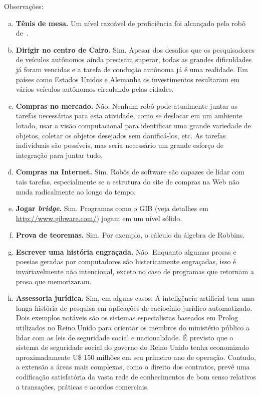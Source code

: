 \begin{solution}
Observações:
\begin{enumerate} [a.]
	\item  \textbf{Tênis de mesa.} Um nível razoável de proficiência foi alcançado pelo robô de~\citet{Andersson1988}.
	
	\item \textbf{Dirigir no centro de Cairo.} Sim. Apesar dos desafios que os pesquisadores de veículos autônomos ainda precisam superar, todas as grandes dificuldades já foram vencidas e a tarefa de condução autônoma já é uma realidade. Em países como Estados Unidos e Alemanha os investimentos resultaram em vários veículos autônomos circulando pelas cidades.
	
	\item \textbf{Compras no mercado.} Não. Nenhum robô pode atualmente juntar as tarefas necessárias para esta atividade, como se deslocar em um ambiente lotado, usar a visão computacional para identificar uma grande variedade de objetos, coletar os objetos desejados sem danificá-los, etc. As tarefas individuais são possíveis, mas seria necessário um grande esforço de integração para juntar tudo.
	
	\item \textbf{Compras na Internet.} Sim. Robôs de software são capazes de lidar com tais tarefas, especialmente se a estrutura do site de compras na Web não muda radicalmente ao longo do tempo.
	
	\item \textbf{Jogar \textit{bridge}.} Sim. Programas como o GIB (veja detalhes em \url{http://www.gibware.com/}) jogam em um nível sólido.
	
	\item \textbf{Prova de teoremas.} Sim. Por exemplo, o cálculo da álgebra de Robbins.
	
	\item \textbf{Escrever uma história engraçada.} Não. Enquanto algumas prosas e poesias geradas por computadores são histericamente engraçadas, isso é invariavelmente não intencional, exceto no caso de programas que retornam a prosa que memorizaram.
	
	\item \textbf{Assessoria jurídica.} Sim, em alguns casos. A inteligência artificial tem uma longa história de pesquisa em aplicações de raciocínio jurídico automatizado. Dois exemplos notáveis são os sistemas especialistas baseados em Prolog utilizados no Reino Unido para orientar os membros do ministério público a lidar com as leis de seguridade social e nacionalidade. É previsto que o sistema de seguridade social do governo do Reino Unido tenha economizado aproximadamente U\$ 150 milhões em seu primeiro ano de operação. Contudo, a extensão a áreas mais complexas, como o direito dos contratos, prevê uma codificação satisfatória da vasta rede de conhecimentos de bom senso relativos a transações, práticas e acordos comerciais.
	

\end{enumerate}
\end{solution}
